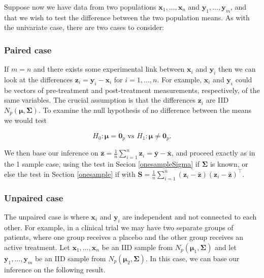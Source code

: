 \documentclass[]{book}
\theoremstyle{definition}
\theoremstyle{definition}
\theoremstyle{definition}
\theoremstyle{remark}
\begin{document}
Suppose now we have data from two populations \(\mathbf x_1, \ldots, \mathbf x_n\) and \(\mathbf y_1,\ldots, \mathbf y_m\), and that we wish to test the difference between the two population means. As with the univariate case, there are two cases to consider:

\hypertarget{paired-case}{%
\subsubsection*{Paired case}\label{paired-case}}

If \(m=n\) and there exists some experimental link between \(\mathbf x_i\) and \(\mathbf y_i\) then we can look at the differences \(\mathbf z_i = \mathbf y_i - \mathbf x_i\) for \(i=1,\ldots,n\). For example, \(\mathbf x_i\) and \(\mathbf y_i\) could be vectors of pre-treatment and post-treatment measurements, respectively, of the same variables. The crucial assumption is that the differences \(\mathbf z_i\) are IID \(N_p({\boldsymbol{\mu}}, \boldsymbol{\Sigma})\). To examine the null hypothesis of no difference between the means we would test

\[H_0: {\boldsymbol{\mu}}={\mathbf 0}_p \mbox{ vs } H_1: {\boldsymbol{\mu}}\neq {\mathbf 0}_p.\]

We then base our inference on \(\bar{\mathbf z} = \frac{1}{n} \sum_{i=1}^n \mathbf z_i = \bar{\mathbf y} - \bar{\mathbf x}\), and proceed exactly as in the 1 sample case, using the test in Secion \ref{onesampleSigma} if \(\boldsymbol{\Sigma}\) is known, or else the test in Section \ref{onesample} if with \(\mathbf S= \frac{1}{n} \sum_{i=1}^n (\mathbf z_i - \bar{\mathbf z})(\mathbf z_i - \bar{\mathbf z})^\top\).

\hypertarget{unpaired-case}{%
\subsubsection*{Unpaired case}\label{unpaired-case}}

The unpaired case is where \(\mathbf x_i\) and \(\mathbf y_i\) are independent and not connected to each other. For example, in a clinical trial we may have two separate groups of patients, where one group receives a placebo and the other group receives an active treatment. Let \(\mathbf x_1,\ldots,\mathbf x_n\) be an IID sample from \(N_p({\boldsymbol{\mu}}_1,\boldsymbol{\Sigma})\) and let \(\mathbf y_1,\ldots,\mathbf y_m\) be an IID sample from \(N_p({\boldsymbol{\mu}}_2,\boldsymbol{\Sigma})\). In this case, we can base our inference on the following result.
\end{document}
